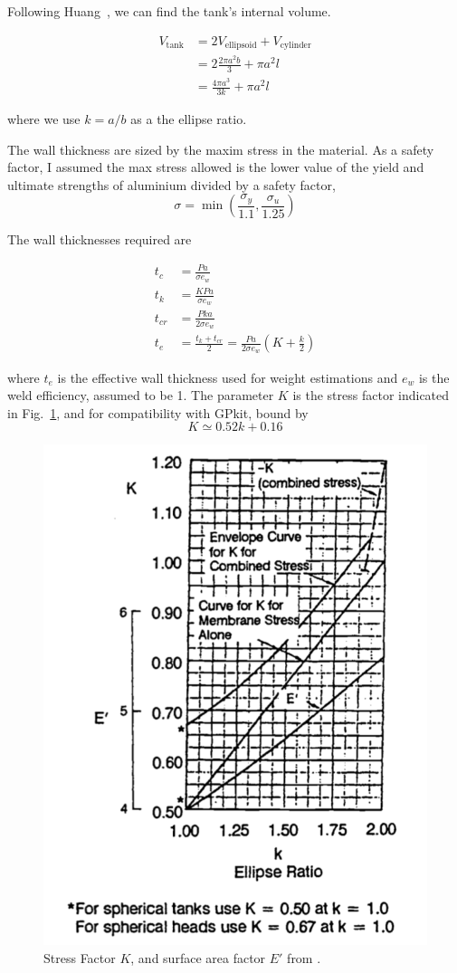 \documentclass[12pt]{article}
\begin{document}
Following Huang~\cite{huang1992}, we can find the tank's internal volume.

\begin{align}
V_\text{tank} &= 2V_\text{ellipsoid} + V_\text{cylinder}\\
&= 2 \frac{2 \pi a^2 b}{3} + \pi a^2 l\\
&= \frac{4 \pi a^3}{3k} + \pi a^2 l
\end{align}

where we use $k= a/b$ as a  the ellipse ratio. 

The wall thickness are sized by the maxim stress in the material. As a safety factor, I assumed the max stress allowed is the lower value of the yield and ultimate strengths of aluminium divided by a safety factor, 
\begin{equation}
\sigma = \min \left(\frac{\sigma_y}{1.1}, \frac{\sigma_u}{1.25}\right)
\end{equation}

The wall thicknesses required are

\begin{align}
t_c &= \frac{Pa}{\sigma e_w}\\
t_k &= \frac{KPa}{\sigma e_w}\\
t_{cr} &= \frac{Pka}{2\sigma e_w}\\
t_e &= \frac{t_{k}+t_{cr}}{2} =  \frac{Pa}{2\sigma e_w} \left(K + \frac{k}{2}\right)
\end{align}

where $t_e$ is the effective wall thickness used for weight estimations and $e_w$ is the weld efficiency, assumed to be 1. The parameter $K$ is the stress factor indicated in Fig.~\ref{fig:stressFactor}, and for compatibility with GPkit, bound by 
\begin{equation}
K \simeq 0.52 k + 0.16
\end{equation}

\begin{figure}[htbp]
   \centering
   \includegraphics[width=0.5\linewidth]{stressFactor}
   \caption{Stress Factor $K$, and surface area factor $E'$ from \cite{huang1992}.}
   \label{fig:stressFactor}
\end{figure}
\end{document}
